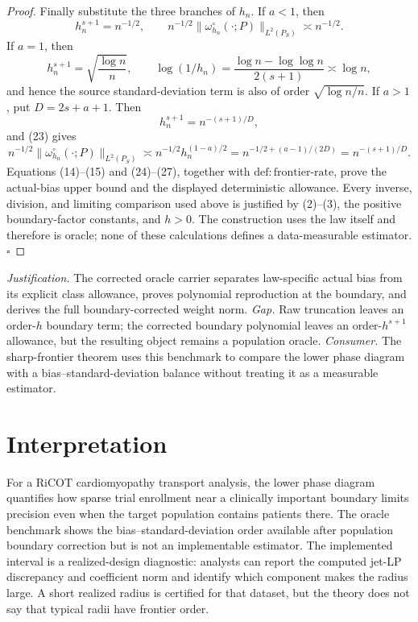 \documentclass{article}
\begin{document}
\begin{proof}
Finally substitute the three branches of \(h_n\). If \(a<1\), then
\[
h_n^{s+1}=n^{-1/2},
\qquad n^{-1/2}\|\omega_{h_n}^{\circ}(\cdot;P)\|_{L^2(P_S)}\asymp n^{-1/2}.
\tag{24}
\]
If \(a=1\), then
\[
h_n^{s+1}=\sqrt{\frac{\log n}{n}},
\qquad
\log(1/h_n)=\frac{\log n-\log\log n}{2(s+1)}\asymp\log n,
\tag{25}
\]
and hence the source standard-deviation term is also of order
\(\sqrt{\log n/n}\). If \(a>1\), put \(D=2s+a+1\). Then
\[
h_n^{s+1}=n^{-(s+1)/D},
\tag{26}
\]
and (23) gives
\[
n^{-1/2}\|\omega_{h_n}^{\circ}(\cdot;P)\|_{L^2(P_S)}
\asymp n^{-1/2}h_n^{(1-a)/2}
=n^{-1/2+(a-1)/(2D)}
=n^{-(s+1)/D}.
\tag{27}
\]
Equations (14)--(15) and (24)--(27), together with
\(\mathrm{def:frontier\text{-}rate}\), prove the actual-bias upper bound and the displayed deterministic allowance. Every inverse, division, and limiting comparison used above is justified by (2)--(3), the positive boundary-factor constants, and \(h>0\). The construction uses the law itself and therefore is oracle; none of these calculations defines a data-measurable estimator. \(\square\)
\end{proof}
\par\smallskip\noindent \textit{Justification.} The corrected oracle carrier separates law-specific actual bias from its explicit class allowance, proves polynomial reproduction at the boundary, and derives the full boundary-corrected weight norm. \textit{Gap.} Raw truncation leaves an order-\(h\) boundary term; the corrected boundary polynomial leaves an order-\(h^{s+1}\) allowance, but the resulting object remains a population oracle. \textit{Consumer.} The sharp-frontier theorem uses this benchmark to compare the lower phase diagram with a bias--standard-deviation balance without treating it as a measurable estimator.

\section{Interpretation}

For a RiCOT cardiomyopathy transport analysis, the lower phase diagram quantifies how sparse trial enrollment near a clinically important boundary limits precision even when the target population contains patients there. The oracle benchmark shows the bias--standard-deviation order available after population boundary correction but is not an implementable estimator. The implemented interval is a realized-design diagnostic: analysts can report the computed jet-LP discrepancy and coefficient norm and identify which component makes the radius large. A short realized radius is certified for that dataset, but the theory does not say that typical radii have frontier order.
\end{document}

